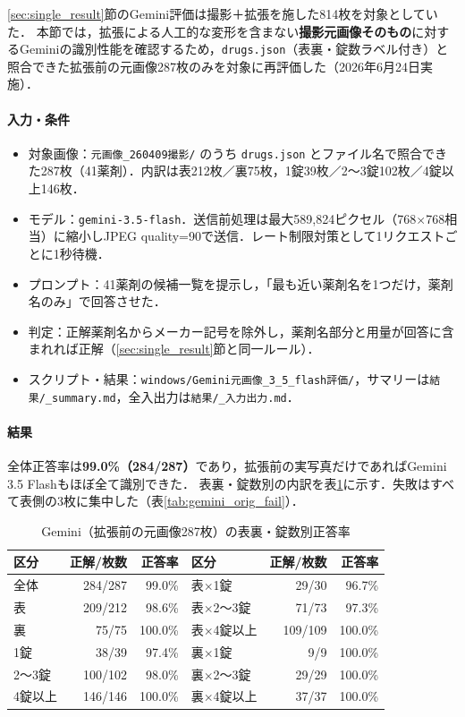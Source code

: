 \documentclass[dvipdfmx]{jsarticle}
\begin{document}
\ref{sec:single_result}節のGemini評価は撮影＋拡張を施した814枚を対象としていた．
本節では，拡張による人工的な変形を含まない\textbf{撮影元画像そのもの}に対するGeminiの識別性能を確認するため，\texttt{drugs.json}（表裏・錠数ラベル付き）と照合できた拡張前の元画像287枚のみを対象に再評価した（2026年6月24日実施）．

\paragraph{入力・条件}
\begin{itemize}
  \item 対象画像：\texttt{元画像\_260409撮影/} のうち \texttt{drugs.json} とファイル名で照合できた287枚（41薬剤）．内訳は表212枚／裏75枚，1錠39枚／2〜3錠102枚／4錠以上146枚．
  \item モデル：\texttt{gemini-3.5-flash}．送信前処理は最大589,824ピクセル（768$\times$768相当）に縮小しJPEG quality=90で送信．レート制限対策として1リクエストごとに1秒待機．
  \item プロンプト：41薬剤の候補一覧を提示し，「最も近い薬剤名を1つだけ，薬剤名のみ」で回答させた．
  \item 判定：正解薬剤名からメーカー記号を除外し，薬剤名部分と用量が回答に含まれれば正解（\ref{sec:single_result}節と同一ルール）．
  \item スクリプト・結果：\texttt{windows/Gemini元画像\_3\_5\_flash評価/}，サマリーは\texttt{結果/\_summary.md}，全入出力は\texttt{結果/\_入力出力.md}．
\end{itemize}

\paragraph{結果}
全体正答率は\textbf{99.0\%（284/287）}であり，拡張前の実写真だけであればGemini 3.5 Flashもほぼ全て識別できた．
表裏・錠数別の内訳を表\ref{tab:gemini_orig}に示す．失敗はすべて表側の3枚に集中した（表\ref{tab:gemini_orig_fail}）．

\begin{table}[htbp]
\centering
\caption{Gemini（拡張前の元画像287枚）の表裏・錠数別正答率}
\label{tab:gemini_orig}
\small
\begin{tabular}{lrr|lrr}
\hline
区分 & 正解/枚数 & 正答率 & 区分 & 正解/枚数 & 正答率 \\
\hline
全体 & 284/287 & 99.0\% & 表$\times$1錠 & 29/30 & 96.7\% \\
表 & 209/212 & 98.6\% & 表$\times$2〜3錠 & 71/73 & 97.3\% \\
裏 & 75/75 & 100.0\% & 表$\times$4錠以上 & 109/109 & 100.0\% \\
1錠 & 38/39 & 97.4\% & 裏$\times$1錠 & 9/9 & 100.0\% \\
2〜3錠 & 100/102 & 98.0\% & 裏$\times$2〜3錠 & 29/29 & 100.0\% \\
4錠以上 & 146/146 & 100.0\% & 裏$\times$4錠以上 & 37/37 & 100.0\% \\
\hline
\end{tabular}
\end{table}
\end{document}
